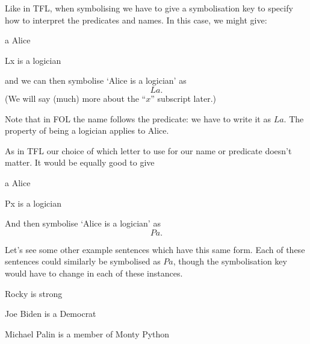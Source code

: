   
Like in TFL, when symbolising we have to give a symbolisation key to specify how to interpret the predicates and names. In this case, we might give:
\begin{ekey}
\item[a] Alice
\item[Lx]  is a logician
\end{ekey}
and we can then symbolise `Alice is a logician' as $$La.$$ (We will say (much) more about the ``$x$'' subscript later.)

Note that in FOL the name follows the predicate: we have to write it as $La$. The property of being a logician applies to Alice. 

As in TFL our choice of which letter to use for our name or predicate doesn't matter. It would be equally good to give
\begin{ekey}
\item[a] Alice
\item[Px]  is a logician
\end{ekey}And then symbolise `Alice is a logician' as $$Pa.$$

Let's see some other example sentences which have this same form. Each of these sentences could similarly be symbolised as $Pa$, though the symbolisation key would have to change in each of these instances.
\begin{earg}
\item[\ex{folrocky}] Rocky is strong
\item[\ex{folbiden}] Joe Biden is a Democrat
\item[\ex{folpalin}] Michael Palin is a member of Monty Python
\end{earg}


